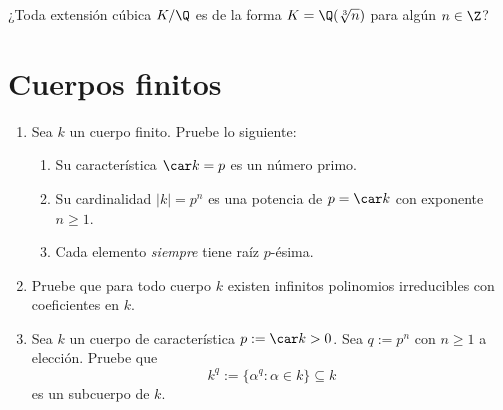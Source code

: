 \documentclass[11pt, reqno]{amsart}
\begin{document}
\begin{prob}
	\lookst
	¿Toda extensión cúbica $K/\Q$ es de la forma $K = \Q(\sqrt[3]{n})$ para algún $n \in \Z$?
\end{prob}

\section{Cuerpos finitos}
\begin{enumerate}[resume]
	\item Sea $k$ un cuerpo finito. Pruebe lo siguiente:
		\begin{enumerate}
			\item Su característica $\car k = p$ es un número primo.
			\item Su cardinalidad $|k| = p^n$ es una potencia de $p = \car k$ con exponente $n \ge 1$.
			\item Cada elemento \emph{siempre} tiene raíz $p$-ésima.
		\end{enumerate}

	\item Pruebe que para todo cuerpo $k$ existen infinitos polinomios irreducibles con coeficientes en $k$.

	\item Sea $k$ un cuerpo de característica $p := \car k > 0$.
		Sea $q := p^n$ con $n \ge 1$ a elección.
		Pruebe que
		\[
			k^q := \{ \alpha^q : \alpha \in k \} \subseteq k
		\]
		es un subcuerpo de $k$.


\end{enumerate}

\nocite{lang:algebra}

\printbibliography
\end{document}
